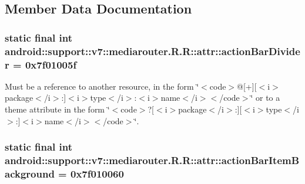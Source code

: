 \subsection{Member Data Documentation}
\hypertarget{classandroid_1_1support_1_1v7_1_1mediarouter_1_1_r_1_1attr_988bd315be705e769eb867ddbc158c0d}{
\subsubsection[{actionBarDivider}]{\setlength{\rightskip}{0pt plus 5cm}static final int android::support::v7::mediarouter.R.R::attr::actionBarDivider = 0x7f01005f}}
\label{classandroid_1_1support_1_1v7_1_1mediarouter_1_1_r_1_1attr_988bd315be705e769eb867ddbc158c0d}


Must be a reference to another resource, in the form \char`\"{}$<$code$>$@\mbox{[}+\mbox{]}\mbox{[}$<$i$>$package$<$/i$>$:\mbox{]}$<$i$>$type$<$/i$>$:$<$i$>$name$<$/i$>$$<$/code$>$\char`\"{} or to a theme attribute in the form \char`\"{}$<$code$>$?\mbox{[}$<$i$>$package$<$/i$>$:\mbox{]}\mbox{[}$<$i$>$type$<$/i$>$:\mbox{]}$<$i$>$name$<$/i$>$$<$/code$>$\char`\"{}. \hypertarget{classandroid_1_1support_1_1v7_1_1mediarouter_1_1_r_1_1attr_401260b63338c6379f1f0152bc7890f0}{
\subsubsection[{actionBarItemBackground}]{\setlength{\rightskip}{0pt plus 5cm}static final int android::support::v7::mediarouter.R.R::attr::actionBarItemBackground = 0x7f010060}}
\label{classandroid_1_1support_1_1v7_1_1mediarouter_1_1_r_1_1attr_401260b63338c6379f1f0152bc7890f0}


